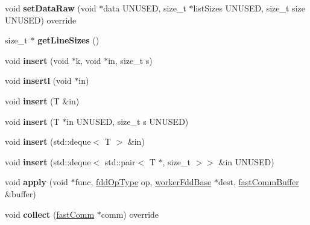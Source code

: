 \begin{DoxyCompactItemize}
void {\bfseries set\+Data\+Raw} (void $\ast$data U\+N\+U\+S\+ED, size\+\_\+t $\ast$list\+Sizes U\+N\+U\+S\+ED, size\+\_\+t size U\+N\+U\+S\+ED) override
\item 
\hypertarget{classfaster_1_1__workerFdd_ad8d2388bc738798cb842f05abe3a232f}{}\label{classfaster_1_1__workerFdd_ad8d2388bc738798cb842f05abe3a232f} 
size\+\_\+t $\ast$ {\bfseries get\+Line\+Sizes} ()
\item 
\hypertarget{classfaster_1_1__workerFdd_a34cd7025c01c615d8da5b2994c3cd4fb}{}\label{classfaster_1_1__workerFdd_a34cd7025c01c615d8da5b2994c3cd4fb} 
void {\bfseries insert} (void $\ast$k, void $\ast$in, size\+\_\+t s)
\item 
\hypertarget{classfaster_1_1__workerFdd_a7c870a264f47310d61d4dc388d7fb588}{}\label{classfaster_1_1__workerFdd_a7c870a264f47310d61d4dc388d7fb588} 
void {\bfseries insertl} (void $\ast$in)
\item 
\hypertarget{classfaster_1_1__workerFdd_a16d0b3a72dee9067c78e6de5c00344d5}{}\label{classfaster_1_1__workerFdd_a16d0b3a72dee9067c78e6de5c00344d5} 
void {\bfseries insert} (T \&in)
\item 
\hypertarget{classfaster_1_1__workerFdd_aa4e0cbecfd3b70916364afb85ebbb042}{}\label{classfaster_1_1__workerFdd_aa4e0cbecfd3b70916364afb85ebbb042} 
void {\bfseries insert} (T $\ast$in U\+N\+U\+S\+ED, size\+\_\+t s U\+N\+U\+S\+ED)
\item 
\hypertarget{classfaster_1_1__workerFdd_af8d23cf110e95bd4a57ed8911e462fcd}{}\label{classfaster_1_1__workerFdd_af8d23cf110e95bd4a57ed8911e462fcd} 
void {\bfseries insert} (std\+::deque$<$ T $>$ \&in)
\item 
\hypertarget{classfaster_1_1__workerFdd_a5294bdf9244698046005cd985fc32047}{}\label{classfaster_1_1__workerFdd_a5294bdf9244698046005cd985fc32047} 
void {\bfseries insert} (std\+::deque$<$ std\+::pair$<$ T $\ast$, size\+\_\+t $>$$>$ \&in U\+N\+U\+S\+ED)
\item 
\hypertarget{classfaster_1_1__workerFdd_a77120c8d7ec05e6683acc699dfa86743}{}\label{classfaster_1_1__workerFdd_a77120c8d7ec05e6683acc699dfa86743} 
void {\bfseries apply} (void $\ast$func, \hyperlink{namespacefaster_a64379512d12d41c6e58f176939abfd80}{fdd\+Op\+Type} op, \hyperlink{classfaster_1_1workerFddBase}{worker\+Fdd\+Base} $\ast$dest, \hyperlink{classfaster_1_1fastCommBuffer}{fast\+Comm\+Buffer} \&buffer)
\item 
\hypertarget{classfaster_1_1__workerFdd_a5571e749cf6d7c1ce83e1a2d242d0240}{}\label{classfaster_1_1__workerFdd_a5571e749cf6d7c1ce83e1a2d242d0240} 
void {\bfseries collect} (\hyperlink{classfaster_1_1fastComm}{fast\+Comm} $\ast$comm) override
$$
\end{DoxyCompactItemize}
